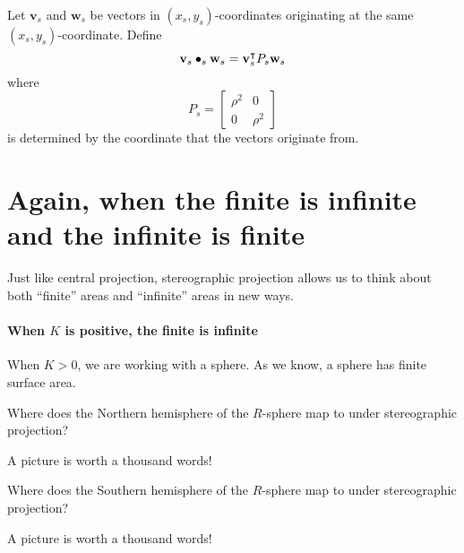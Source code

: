 \documentclass[newpage,hints,handout]{ximera}
\begin{document}
\begin{definition}
  Let $\mathbf{v}_s$ and $\mathbf{w}_s$ be vectors in $(x_s,y_s)$-coordinates
  originating at the same $(x_s,y_s)$-coordinate. Define
  \[
  \mathbf{v}_s \bullet_s \mathbf{w}_s = \mathbf{v}_s^\intercal P_s \mathbf{w}_s
  \]
  where
  \[
  P_s =
  \begin{bmatrix}
    \rho^2 & 0\\
    0 & \rho^2
  \end{bmatrix}
  \]
  is determined by the coordinate that the vectors originate from.
\end{definition}








\section{Again, when the finite is infinite and the infinite is finite}

Just like central projection, stereographic projection allows us to
think about both ``finite'' areas and ``infinite'' areas in new ways.

\paragraph{When $K$ is positive, the finite is infinite}

When $K>0$, we are working with a sphere. As we know, a sphere has
finite surface area.



\begin{problem}
  Where does the Northern hemisphere of the $R$-sphere map to under stereographic projection?
  \begin{hint}
    A picture is worth a thousand words!
  \end{hint}
  \begin{freeResponse}
  \end{freeResponse}
\end{problem}


\begin{problem}
  Where does the Southern hemisphere of the $R$-sphere map to under stereographic projection?
  \begin{hint}
    A picture is worth a thousand words!
  \end{hint}
  \begin{freeResponse}
  \end{freeResponse}
\end{problem}
\end{document}
